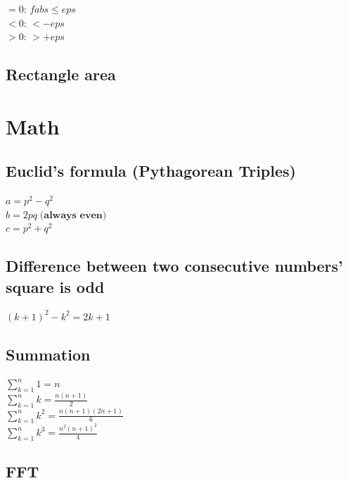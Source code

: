\documentclass[10pt,oneside]{article}
\begin{document}
\begin{landscape}
\begin{multicols}{2}
{$=0$: $fabs \leq eps$\\
$<0$: $ < -eps$\\
$>0$: $ > +eps$
}


\subsection{Rectangle area}

\section{Math}

\subsection{Euclid's formula (Pythagorean Triples)}

{\normalsize 
$a = p^2 - q^2 $\\
$b = 2pq \; \textbf{(always even)}$ \\
$c = p^2 + q^2$\\
}

\subsection{Difference between two consecutive numbers' square is odd}

{\normalsize 
$(k + 1)^2 - k^2 = 2k + 1$
}

\subsection{Summation}

{\normalsize 
$\sum_{k=1}^{n} 1= n$\\
$\sum_{k=1}^{n} k= \frac{n(n+1)}{2}$\\
$\sum_{k=1}^{n} k^2= \frac{n(n+1)(2n+1)}{6}$\\
$\sum_{k=1}^{n} k^3= \frac{n^2(n+1)^2}{4}$\\
}

\subsection{FFT}


\end{multicols}
\end{landscape}
\end{document}
